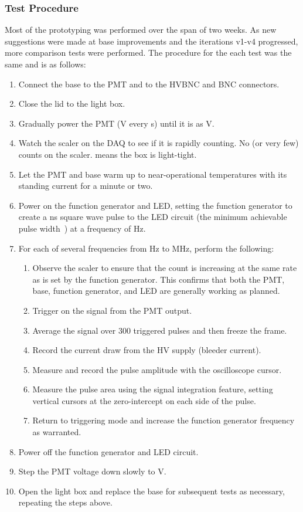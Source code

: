 \subsubsection{Test Procedure}

Most of the prototyping was performed over the span of two weeks. As new suggestions were made at base improvements and the iterations v1-v4 progressed, more comparison tests were performed. The procedure for the each test was the same and is as follows:
\begin{enumerate}[itemsep=-1ex]
	\item Connect the base to the PMT and to the HVBNC and BNC connectors.
	\item Close the lid to the light box.
	\item Gradually power the PMT (\unit[-250]{V} every \unit[5]{s}) until it is as \unit[-1500]{V}.
	\item Watch the scaler on the DAQ to see if it is rapidly counting. No (or very few) counts on the scaler. means the box is light-tight.
	\item Let the PMT and base warm up to near-operational temperatures with its standing current for a minute or two.
	\item Power on the function generator and LED, setting the function generator to create a \unit[16]{ns} square wave pulse to the LED circuit (the minimum achievable pulse width~\cite{agilent:33520}) at a frequency of \unit[10]{Hz}.
	\item For each of several frequencies from \unit[10]{Hz} to \unit[30]{MHz}, perform the following:
	\begin{enumerate}[itemsep=-1ex]
		\item Observe the scaler to ensure that the count is increasing at the same rate as is set by the function generator. This confirms that both the PMT, base, function generator, and LED are generally working as planned.
		\item Trigger on the signal from the PMT output.
		\item Average the signal over 300 triggered pulses and then freeze the frame.
		\item Record the current draw from the HV supply (bleeder current).
		\item Measure and record the pulse amplitude with the oscilloscope cursor.
		\item Measure the pulse area using the signal integration feature, setting vertical cursors at the zero-intercept on each side of the pulse.
		\item Return to triggering mode and increase the function generator frequency as warranted.
	\end{enumerate}
	\item Power off the function generator and LED circuit.
	\item Step the PMT voltage down slowly to \unit[0]{V}.
	\item Open the light box and replace the base for subsequent tests as necessary, repeating the steps above.
\end{enumerate}

